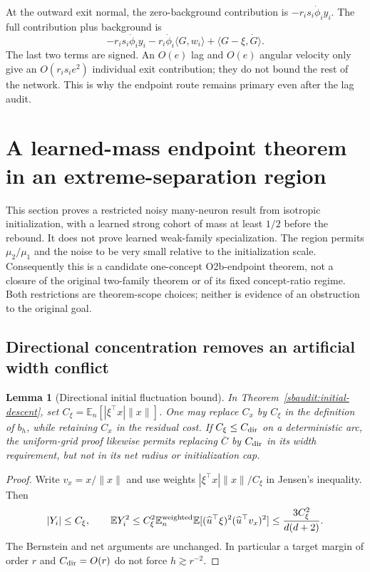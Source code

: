 \documentclass{article} %
\theoremstyle{plain}
\newtheorem{lemma}[theorem]{Lemma}
\theoremstyle{definition}
\theoremstyle{remark}
\begin{document}
At the outward exit normal, the zero-background contribution is
$-r_is_i\dot\phi_i y_i$. The full contribution plus background is
\[
 -r_is_i\dot\phi_i y_i
 -r_i\dot\phi_i\langle G,w_i\rangle
 +\langle G-\xi,\dot G\rangle.
\]
The last two terms are signed. An $O(e)$ lag and $O(e)$ angular velocity
only give an $O(r_is_i e^2)$ individual exit contribution; they do not
bound the rest of the network. This is why the endpoint route remains
primary even after the lag audit.

\section{A learned-mass endpoint theorem in an extreme-separation region}
\label{sbsep:scope}

This section proves a restricted noisy many-neuron result from isotropic
initialization, with a learned strong cohort of mass at least $1/2$ before
the rebound. It does not prove learned weak-family specialization. The
region permits $\mu_2/\mu_1$ and the noise to be very small relative to the
initialization scale. Consequently this is a candidate one-concept
O2b-endpoint theorem, not a closure of the original two-family theorem or
of its fixed concept-ratio regime. Both restrictions are theorem-scope
choices; neither is evidence of an obstruction to the original goal.

\subsection{Directional concentration removes an artificial width conflict}

\begin{lemma}[Directional initial fluctuation bound]
\label{sbsep:directional-variance}
In Theorem~\ref{sbaudit:initial-descent}, set
$C_\xi=\mathbb E_n[|\xi^\top x|\|x\|]$. One may replace $C_x$ by
$C_\xi$ in the definition of $b_h$, while retaining $C_x$ in the residual
cost. If $C_\xi\le C_{\rm dir}$ on a deterministic arc, the uniform-grid
proof likewise permits replacing $\overline C$ by $C_{\rm dir}$ in its
width requirement, but not in its net radius or initialization cap.
\end{lemma}
\begin{proof}
Write $v_x=x/\|x\|$ and use weights
$|\xi^\top x|\|x\|/C_\xi$ in Jensen's inequality. Then
\[
 |Y_i|\le C_\xi,\qquad
 \mathbb EY_i^2\le C_\xi^2\mathbb E_n^{\rm weighted}
 \mathbb E[(\widehat u^\top\xi)^2(\widehat u^\top v_x)^2]
 \le\frac{3C_\xi^2}{d(d+2)}.
\]
The Bernstein and net arguments are unchanged. In particular a target
margin of order $r$ and $C_{\rm dir}=O(r)$ do not force $h\gtrsim r^{-2}$.
\end{proof}
\end{document}
